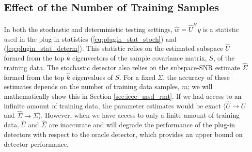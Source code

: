 \subsection{Effect of the Number of Training Samples}\label{sec:training_effect}
In both the stochastic and deterministic testing settings, $\widehat{w}=\widehat{U}^Hy$ is a statistic used in the plug-in statistics (\ref{eq:plugin_stat_stoch}) and (\ref{eq:plugin_stat_determ}). This statistic relies on the estimated subspace $\widehat{U}$ formed from the top $\widehat{k}$ eigenvectors of the sample covariance matrix, $S$, of the training data. The stochastic detector also relies on the subspace-SNR estimate $\widehat{\Sigma}$ formed from the top $\widehat{k}$ eigenvalues of $S$. For a fixed $\Sigma$, the accuracy of these estimates depends on the number of training data samples, $m$; we will mathematically show this in Section \ref{sec:ieee_msd_rmt}. If we had access to an infinite amount of training data, the parameter estimates would be exact ($\widehat{U}\to U$ and $\widehat{\Sigma}\to\Sigma$). However, when we have access to only a finite amount of training data, $\widehat{U}$ and $\widehat{\Sigma}$ are inaccurate and will degrade the performance of the plug-in detectors with respect to the oracle detector, which provides an upper bound on detector performance.

